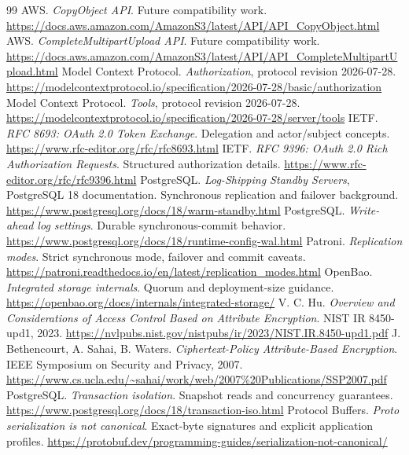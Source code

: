\begin{thebibliography}{99}
 AWS. \emph{CopyObject API}. Future compatibility work. \url{https://docs.aws.amazon.com/AmazonS3/latest/API/API_CopyObject.html}
 AWS. \emph{CompleteMultipartUpload API}. Future compatibility work. \url{https://docs.aws.amazon.com/AmazonS3/latest/API/API_CompleteMultipartUpload.html}
 Model Context Protocol. \emph{Authorization}, protocol revision 2026-07-28. \url{https://modelcontextprotocol.io/specification/2026-07-28/basic/authorization}
 Model Context Protocol. \emph{Tools}, protocol revision 2026-07-28. \url{https://modelcontextprotocol.io/specification/2026-07-28/server/tools}
 IETF. \emph{RFC 8693: OAuth 2.0 Token Exchange}. Delegation and actor/subject concepts. \url{https://www.rfc-editor.org/rfc/rfc8693.html}
 IETF. \emph{RFC 9396: OAuth 2.0 Rich Authorization Requests}. Structured authorization details. \url{https://www.rfc-editor.org/rfc/rfc9396.html}
 PostgreSQL. \emph{Log-Shipping Standby Servers}, PostgreSQL 18 documentation. Synchronous replication and failover background. \url{https://www.postgresql.org/docs/18/warm-standby.html}
 PostgreSQL. \emph{Write-ahead log settings}. Durable synchronous-commit behavior. \url{https://www.postgresql.org/docs/18/runtime-config-wal.html}
 Patroni. \emph{Replication modes}. Strict synchronous mode, failover and commit caveats. \url{https://patroni.readthedocs.io/en/latest/replication_modes.html}
 OpenBao. \emph{Integrated storage internals}. Quorum and deployment-size guidance. \url{https://openbao.org/docs/internals/integrated-storage/}
 V. C. Hu. \emph{Overview and Considerations of Access Control Based on Attribute Encryption}. NIST IR 8450-upd1, 2023. \url{https://nvlpubs.nist.gov/nistpubs/ir/2023/NIST.IR.8450-upd1.pdf}
 J. Bethencourt, A. Sahai, B. Waters. \emph{Ciphertext-Policy Attribute-Based Encryption}. IEEE Symposium on Security and Privacy, 2007. \url{https://www.cs.ucla.edu/~sahai/work/web/2007%20Publications/SSP2007.pdf}
 PostgreSQL. \emph{Transaction isolation}. Snapshot reads and concurrency guarantees. \url{https://www.postgresql.org/docs/18/transaction-iso.html}
 Protocol Buffers. \emph{Proto serialization is not canonical}. Exact-byte signatures and explicit application profiles. \url{https://protobuf.dev/programming-guides/serialization-not-canonical/}
\end{thebibliography}
